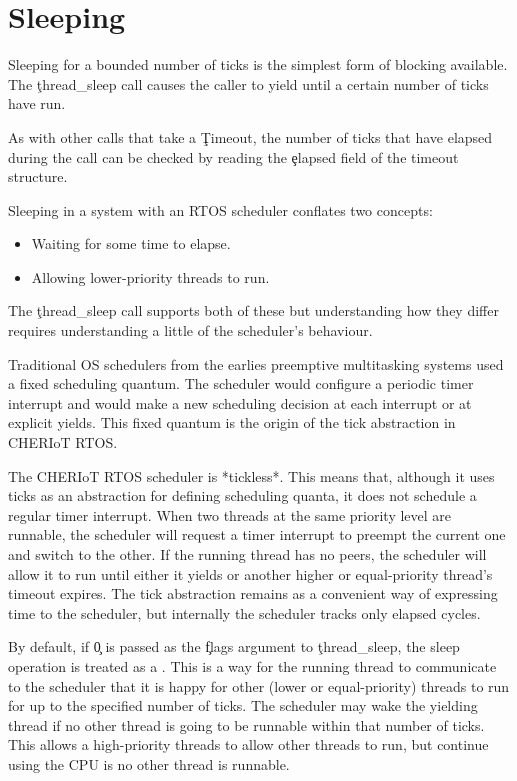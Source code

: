 \section{Sleeping}

Sleeping for a bounded number of ticks is the simplest form of blocking available.
The \c{thread_sleep} call causes the caller to yield until a certain number of ticks have run.


As with other calls that take a \c{Timeout}, the number of ticks that have elapsed during the call can be checked by reading the \c{elapsed} field of the timeout structure.

Sleeping in a system with an RTOS scheduler conflates two concepts:

\begin{itemize}
	\item{Waiting for some time to elapse.}
	\item{Allowing lower-priority threads to run.}
\end{itemize}

The \c{thread_sleep} call supports both of these but understanding how they differ requires understanding a little of the scheduler's behaviour.

Traditional OS schedulers from the earlies preemptive multitasking systems used a fixed scheduling quantum.
The scheduler would configure a periodic timer interrupt and would make a new scheduling decision at each interrupt or at explicit yields.
This fixed quantum is the origin of the tick abstraction in CHERIoT RTOS.

The CHERIoT RTOS scheduler is *tickless*.
This means that, although it uses ticks as an abstraction for defining scheduling quanta, it does not schedule a regular timer interrupt.
When two threads at the same priority level are runnable, the scheduler will request a timer interrupt to preempt the current one and switch to the other.
If the running thread has no peers, the scheduler will allow it to run until either it yields or another higher or equal-priority thread's timeout expires.
The tick abstraction remains as a convenient way of expressing time to the scheduler, but internally the scheduler tracks only elapsed cycles.

By default, if \c{0} is passed as the \c{flags} argument to \c{thread_sleep}, the sleep operation is treated as a .
This is a way for the running thread to communicate to the scheduler that it is happy for other (lower or equal-priority) threads to run for up to the specified number of ticks.
The scheduler may wake the yielding thread if no other thread is going to be runnable within that number of ticks.
This allows a high-priority threads to allow other threads to run, but continue using the CPU is no other thread is runnable.


